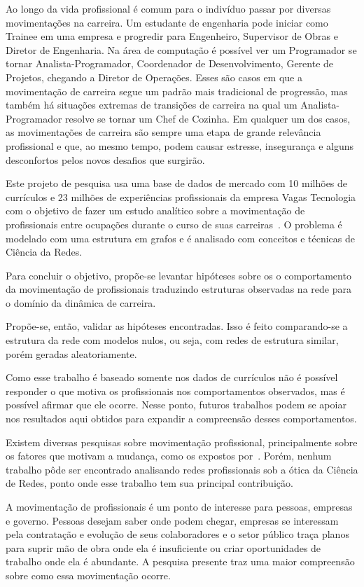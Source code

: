 \documentclass[12pt,a4paper]{article}
\theoremstyle{hypo}
\begin{document}
Ao longo da vida profissional é comum para o indivíduo passar por diversas movimentações na carreira. Um estudante de engenharia pode iniciar como Trainee em uma empresa e progredir para Engenheiro, Supervisor de Obras e Diretor de Engenharia. Na área de computação é possível ver um Programador se tornar Analista-Programador, Coordenador de Desenvolvimento, Gerente de Projetos, chegando a Diretor de Operações. Esses são casos em que a movimentação de carreira segue um padrão mais tradicional de progressão, mas também há situações extremas de transições de carreira na qual um Analista-Programador resolve se tornar um Chef de Cozinha. Em qualquer um dos casos, as movimentações de carreira são sempre uma etapa de grande relevância profissional e que, ao mesmo tempo, podem causar estresse, insegurança e alguns desconfortos pelos novos desafios que surgirão.

Este projeto de pesquisa usa uma base de dados de mercado com 10 milhões de currículos e 23 milhões de experiências profissionais da empresa Vagas Tecnologia com o objetivo de fazer um estudo analítico sobre a movimentação de profissionais entre ocupações durante o curso de suas carreiras~. O problema é modelado com uma estrutura em grafos e é analisado com conceitos e técnicas de Ciência da Redes.

Para concluir o objetivo, propõe-se levantar hipóteses sobre os o comportamento da movimentação de profissionais traduzindo estruturas observadas na rede para o domínio da dinâmica de carreira.

Propõe-se, então, validar as hipóteses encontradas. Isso é feito comparando-se a estrutura da rede com modelos nulos, ou seja, com redes de estrutura similar, porém geradas aleatoriamente.

Como esse trabalho é baseado somente nos dados de currículos não é possível responder o que motiva os profissionais nos comportamentos observados, mas é possível afirmar que ele ocorre. Nesse ponto, futuros trabalhos podem se apoiar nos resultados aqui obtidos para expandir a compreensão desses comportamentos.

Existem diversas pesquisas sobre movimentação profissional, principalmente sobre os fatores que motivam a mudança, como os expostos por~. Porém, nenhum trabalho pôde ser encontrado analisando redes profissionais sob a ótica da Ciência de Redes, ponto onde esse trabalho tem sua principal contribuição.

A movimentação de profissionais é um ponto de interesse para pessoas, empresas e governo. Pessoas desejam saber onde podem chegar, empresas se interessam pela contratação e evolução de seus colaboradores e o setor público traça planos para suprir mão de obra onde ela é insuficiente ou criar oportunidades de trabalho onde ela é abundante. A pesquisa presente traz uma maior compreensão sobre como essa movimentação ocorre.
\end{document}
